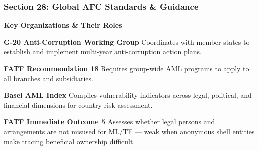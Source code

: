 \documentclass[12pt,aspectratio=169]{beamer}
\renewcommand{\scriptsize}{\fontsize{5}{6}\selectfont}
\begin{document}
	\begin{frame}
		\frametitle{\fontsize{13}{15}\selectfont \textbf{Section 28: Global AFC Standards \& Guidance}}
		\vspace{0.3cm}
		\begin{center}
			{\fontsize{12}{14}\selectfont \textbf{Key Organizations \& Their Roles}}
		\end{center}
		\vspace{0.1cm}
		\begin{block}{\textbf{G-20 Anti-Corruption Working Group}}
			\scriptsize
			Coordinates with member states to establish and implement multi-year anti-corruption action plans.
		\end{block}
		\begin{block}{\textbf{FATF Recommendation 18}}
			\scriptsize
			Requires group-wide AML programs to apply to all branches and subsidiaries.
		\end{block}
		\begin{block}{\textbf{Basel AML Index}}
			\scriptsize
			Compiles vulnerability indicators across legal, political, and financial dimensions for country risk assessment.
		\end{block}
		\begin{block}{\textbf{FATF Immediate Outcome 5}}
			\scriptsize
			Assesses whether legal persons and arrangements are not misused for ML/TF — weak when anonymous shell entities make tracing beneficial ownership difficult.
		\end{block}
	\end{frame}
	
\end{document}
